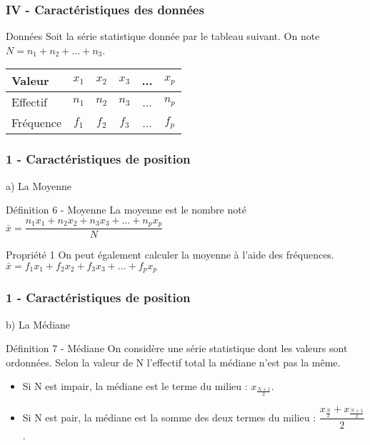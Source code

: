 \documentclass{beamer}
\begin{document}
\begin{frame}
  \frametitle{IV - Caractéristiques des données}

  \begin{block}{Données}
    Soit la série statistique donnée par le tableau suivant. On note $N = n_1 + n_2 + ... + n_3$.

    \begin{center}
      \begin{tabular}{| l || c | c | c | c | c |}
        \hline
        Valeur    & $x_1$ & $x_2$ & $x_3$ & ... & $x_p$\\
        \hline
        Effectif  & $n_1$ & $n_2$ & $n_3$ & ... & $n_p$\\
        \hline
        Fréquence & $f_1$ & $f_2$ & $f_3$ & ... & $f_p$\\
        \hline
      \end{tabular}
    \end{center}
  \end{block}
\end{frame}

\begin{frame}
  \frametitle{1 - Caractéristiques de position}
  
  \begin{block}{a) La Moyenne}
  \end{block}
  
  \begin{alertblock}{Définition 6 - Moyenne}
    La moyenne est le nombre noté $\bar{x} = \dfrac{n_1 x_1 + n_2 x_2 + n_3 x_3 + ... + n_p x_p}{N}$\\
  \end{alertblock}
  
  \begin{block}{Propriété 1}
    On peut également calculer la moyenne à l'aide des fréquences.\\
    $\bar{x} = f_1 x_1 + f_2 x_2 + f_3 x_3 + ... + f_p x_p$\\
  \end{block}
\end{frame}


\begin{frame}
  \frametitle{1 - Caractéristiques de position}
  
  \begin{block}{b) La Médiane}
  \end{block}
  
  \begin{alertblock}{Définition 7 - Médiane}
    On considère une série statistique dont les valeurs sont ordonnées. Selon la valeur de N l'effectif total la médiane n'est pas la même.
    \begin{itemize}
    \item Si N est impair, la médiane est le terme du milieu : $x_{\frac{N + 1}{2}}$.
    \item Si N est pair, la médiane est la somme des deux termes du milieu : $\dfrac{x_{\frac{N}{2}} + x_{\frac{N+1}{2}}}{2}$.
    \end{itemize}
  \end{alertblock}
\end{frame}
\end{document}
